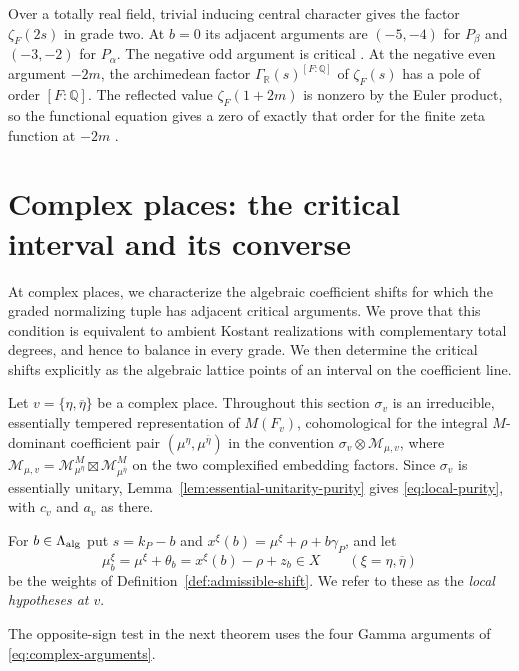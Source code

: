 \documentclass[12pt]{amsart}
\numberwithin{equation}{section}
\theoremstyle{plain}
\theoremstyle{definition}
\theoremstyle{remark}
\renewcommand{\bar}{\overline}
\newcommand{\Q}{\mathbb Q}
\newcommand{\cM}{\mathcal M}
\begin{document}
Over a totally real field, trivial inducing central character gives the factor $\zeta_F(2s)$ in grade two. At $b=0$ its adjacent arguments are $(-5,-4)$ for $P_\beta$ and $(-3,-2)$ for $P_\alpha$. The negative odd argument is critical \cite[Prop.~23(i)]{RaghuramHecke2022}. At the negative even argument \(-2m\), the archimedean factor \(\Gamma_{\mathbb R}(s)^{[F:\Q]}\) of \(\zeta_F(s)\) has a pole of order \([F:\Q]\). The reflected value \(\zeta_F(1+2m)\) is nonzero by the Euler product, so the functional equation gives a zero of exactly that order for the finite zeta function at \(-2m\) \cite[\S4.2.4]{RaghuramHecke2022}. 

\section{Complex places: the critical interval and its converse} \label{sec:complex-criterion}
At complex places, we characterize the algebraic coefficient shifts for which the graded normalizing tuple has adjacent critical arguments. We prove that this condition is equivalent to ambient Kostant realizations with complementary total degrees, and hence to balance in every grade. We then determine the critical shifts explicitly as the algebraic lattice points
of an interval on the coefficient line.

Let $v=\{\eta,\bar\eta\}$ be a complex place. Throughout this section $\sigma_v$ is an irreducible, essentially tempered representation of $M(F_v)$, cohomological for the integral $M$-dominant coefficient pair $(\mu^\eta,\mu^{\bar\eta})$ in the convention $\sigma_v\otimes\cM_{\mu,v}$, where $\cM_{\mu,v}=\cM^M_{\mu^\eta}\boxtimes\cM^M_{\mu^{\bar\eta}}$ on the two complexified embedding factors. Since $\sigma_v$ is essentially unitary, Lemma~\ref{lem:essential-unitarity-purity} gives \eqref{eq:local-purity}, with $c_v$ and $a_v$ as there.

For $b\in\Lambda_{\rm alg}$ put $s=k_P-b$ and $x^\xi(b)=\mu^\xi+\rho+b\gamma_P$, and let
\[
 \mu_b^\xi=\mu^\xi+\theta_b=x^\xi(b)-\rho+z_b\in X
 \qquad(\xi=\eta,\bar\eta)
\]
be the weights of Definition~\ref{def:admissible-shift}. We refer to these as the \emph{local hypotheses at $v$}.

The opposite-sign test in the next theorem uses the four Gamma arguments of \eqref{eq:complex-arguments}.
\end{document}
